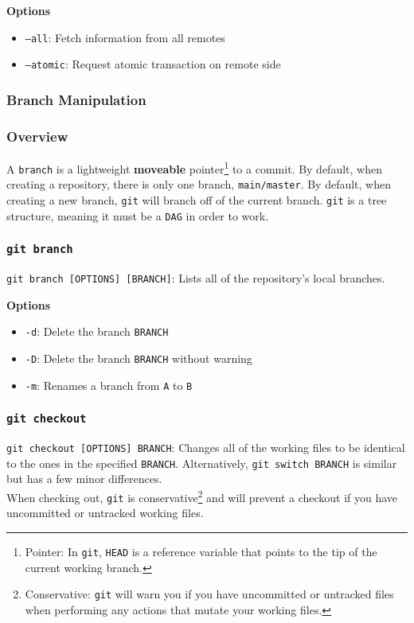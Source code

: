 \documentclass[13pt]{article}
\begin{document}
\textbf{Options}
\begin{itemize}[label=]
\item \texttt{--all}: Fetch information from all remotes
\item \texttt{--atomic}: Request atomic transaction on remote side
\end{itemize}





\subsubsection{Branch Manipulation}
\subsubsection{Overview}
A \texttt{branch} is a lightweight \textbf{moveable} pointer\footnote{Pointer: In \texttt{git}, \texttt{HEAD} is a reference variable that points to the tip of the current working branch.} to a commit. By default, when creating a repository, there is only one branch, \texttt{main/master}. By default, when creating a new branch, \texttt{git} will branch off of the current branch. \texttt{git} is a tree structure, meaning it  must be a \texttt{DAG} in order to work.


\subsubsection*{\texttt{git branch}}
\texttt{git branch [OPTIONS] [BRANCH]}: Lists all of the repository's local branches.

\textbf{Options}
\begin{itemize}[label=]
\item \texttt{-d}: Delete the branch \texttt{BRANCH}
\item \texttt{-D}: Delete the branch \texttt{BRANCH} without warning
\item \texttt{-m}: Renames a branch from \texttt{A} to \texttt{B}
\end{itemize}

\subsubsection*{\texttt{git checkout}}
\texttt{git checkout [OPTIONS] BRANCH}: Changes all of the working files to be identical to the ones in the specified \texttt{BRANCH}. Alternatively, \texttt{git switch BRANCH} is similar but has a few minor differences. \\
When checking out, \texttt{git} is conservative\footnote{Conservative: \texttt{git} will warn you if you have uncommitted or untracked files when performing any actions that mutate your working files.} and will prevent a checkout if you have uncommitted or untracked working files.
\end{document}
